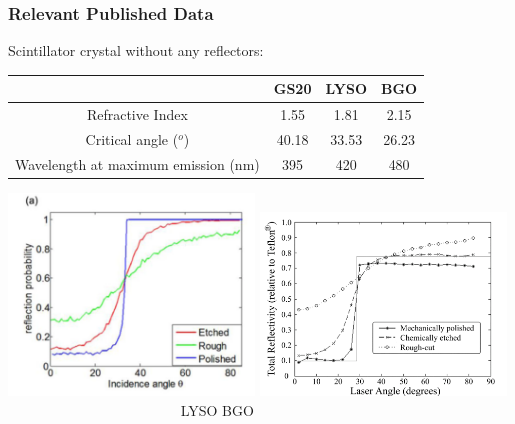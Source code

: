 \documentclass[xcolor=x11names, compress, handout]{beamer}
\renewcommand{\(}{\begin{columns}}
\renewcommand{\)}{\end{columns}}
\newcommand{\<}[1]{\begin{column}{#1}}
\renewcommand{\>}{\end{column}}
\begin{document}
\begin{frame}
\frametitle{Relevant Published Data}
\begin{block}{Scintillator crystal without any reflectors: }
\centering \scriptsize
\begin{tabular}{ c | c c c}
& GS20 & LYSO & BGO \\
\hline
Refractive Index & 1.55 & 1.81 & 2.15 \\
Critical angle ($^o$) & 40.18 & 33.53 & 26.23 \\ 
Wavelength at maximum emission (nm) & 395 & 420 & 480 \\
\end{tabular}
\end{block}

\includegraphics[width=0.49\textwidth, height=0.45\textheight]{images/LYSO_reflectivity_angular_distribution.png}
\includegraphics[width=0.49\textwidth, height=0.45\textheight]{images/BGO_reflectivity_angular_distribution.png}
\scriptsize \flushleft~~~~~~~~~~~~~~~~~~~~~~~~ LYSO \cite{roncali_stockhoff_cherry_2017} \hspace{5cm} BGO \cite{janecek_moses_2010} \hspace{3cm}
\end{frame}
\end{document}
